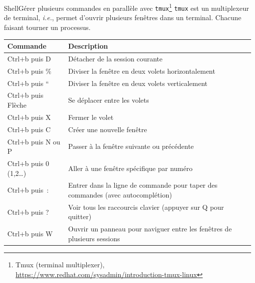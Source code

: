 \documentclass{beamer}
\begin{document}
    \begin{frame}{Shell}{Gérer plusieurs commandes en parallèle avec \lstinline{tmux}\footnote{\label{tmux}Tmux (terminal multiplexer), \url{https://www.redhat.com/sysadmin/introduction-tmux-linux}}}
        \lstinline{tmux} est un multiplexeur de terminal, \textit{i.e.}, permet d'ouvrir plusieurs fenêtres dans un terminal.
        Chacune faisant tourner un processus.
        \begin{footnotesize}
            \begin{table}[ht]
                \centering
                \begin{tabular}{|p{3.5cm}|p{8cm}|}
                    \hline
                    \textbf{Commande}         & \textbf{Description}                                                            \\
                    \hline
                    Ctrl+b puis D             & Détacher de la session courante                                                 \\
                    \hline
                    Ctrl+b puis \%            & Diviser la fenêtre en deux volets horizontalement                               \\
                    \hline
                    Ctrl+b puis ``            & Diviser la fenêtre en deux volets verticalement                                 \\
                    \hline
                    Ctrl+b puis Flèche        & Se déplacer entre les volets                                                    \\
                    \hline
                    Ctrl+b puis X             & Fermer le volet                                                                 \\
                    \hline
                    Ctrl+b puis C             & Créer une nouvelle fenêtre                                                      \\
                    \hline
                    Ctrl+b puis N ou P        & Passer à la fenêtre suivante ou précédente                                      \\
                    \hline
                    Ctrl+b puis 0 (1,2\ldots) & Aller à une fenêtre spécifique par numéro                                       \\
                    \hline
                    Ctrl+b puis~:             & Entrer dans la ligne de commande pour taper des commandes (avec autocomplétion) \\
                    \hline
                    Ctrl+b puis ?             & Voir tous les raccourcis clavier (appuyer sur Q pour quitter)                   \\
                    \hline
                    Ctrl+b puis W             & Ouvrir un panneau pour naviguer entre les fenêtres de plusieurs sessions        \\
                    \hline
                \end{tabular}
            \end{table}
        \end{footnotesize}
    \end{frame}
\end{document}
